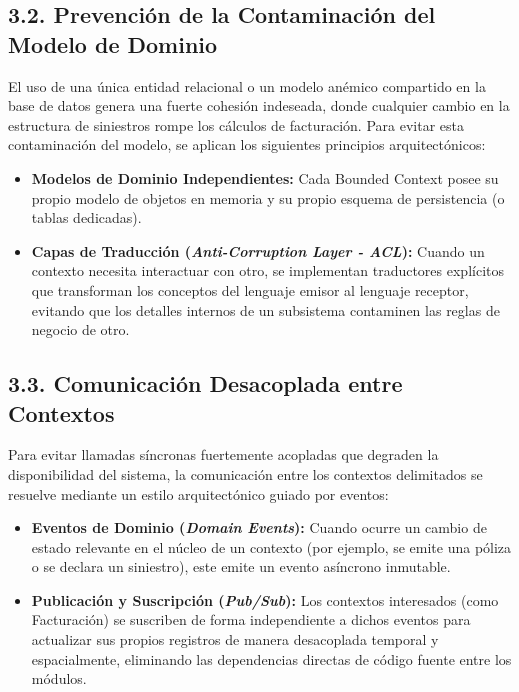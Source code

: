 \documentclass[12pt,a4paper]{article}
\begin{document}
\subsection*{3.2. Prevención de la Contaminación del Modelo de Dominio}
El uso de una única entidad relacional o un modelo anémico compartido en la base de datos genera una fuerte cohesión indeseada, donde cualquier cambio en la estructura de siniestros rompe los cálculos de facturación. Para evitar esta contaminación del modelo, se aplican los siguientes principios arquitectónicos:
\begin{itemize}
    \item \textbf{Modelos de Dominio Independientes:} Cada Bounded Context posee su propio modelo de objetos en memoria y su propio esquema de persistencia (o tablas dedicadas).
    \item \textbf{Capas de Traducción (\textit{Anti-Corruption Layer - ACL}):} Cuando un contexto necesita interactuar con otro, se implementan traductores explícitos que transforman los conceptos del lenguaje emisor al lenguaje receptor, evitando que los detalles internos de un subsistema contaminen las reglas de negocio de otro.
\end{itemize}

\subsection*{3.3. Comunicación Desacoplada entre Contextos}
Para evitar llamadas síncronas fuertemente acopladas que degraden la disponibilidad del sistema, la comunicación entre los contextos delimitados se resuelve mediante un estilo arquitectónico guiado por eventos:
\begin{itemize}
    \item \textbf{Eventos de Dominio (\textit{Domain Events}):} Cuando ocurre un cambio de estado relevante en el núcleo de un contexto (por ejemplo, se emite una póliza o se declara un siniestro), este emite un evento asíncrono inmutable.
    \item \textbf{Publicación y Suscripción (\textit{Pub/Sub}):} Los contextos interesados (como Facturación) se suscriben de forma independiente a dichos eventos para actualizar sus propios registros de manera desacoplada temporal y espacialmente, eliminando las dependencias directas de código fuente entre los módulos.
\end{itemize}
\end{document}
